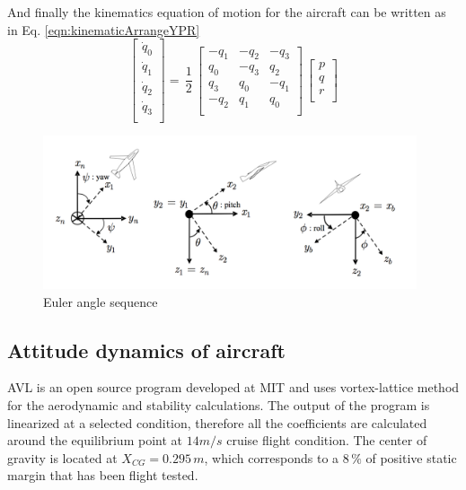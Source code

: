 And finally the kinematics equation of motion for the aircraft can be written as in Eq. \ref{eqn:kinematicArrangeYPR}
\begin{equation} \label{eqn:kinematicArrangeYPR}
\begin{bmatrix}
\dot{q}_0\\[0.2em]
\dot{q}_1\\[0.2em]
\dot{q}_2\\[0.2em]
\dot{q}_3\\[0.2em]
\end{bmatrix}
 =\,
\frac{1}{2}
\,
\begin{bmatrix}
-q_1 & -q_2 & -q_3 \\
q_0 & -q_3 & q_2 \\
q_3 & q_0 & -q_1 \\
-q_2 & q_1 & q_0\\
\end{bmatrix}
\,
\begin{bmatrix}
p\\[0.2em]
q\\[0.2em]
r\\[0.2em]
\end{bmatrix} 
\end{equation}

\begin{figure}
\begin{center}
\includegraphics[width=11cm]{figures/eulerAngSequence}    %
\caption{Euler angle sequence \cite{ducard2009fault}} 
\label{fig:eulerAngSequence}
\end{center}
\end{figure}

\subsection{Attitude dynamics of aircraft}

AVL is an open source program developed at MIT and uses vortex-lattice method for the aerodynamic and stability calculations.
The output of the program is linearized at a selected condition, therefore all the coefficients are calculated around the equilibrium point at $14m/s$ cruise flight condition.
The center of gravity is located at $X_{CG}= 0.295\,m$, which corresponds to a $8\,\%$ of positive static margin that has been flight tested. %


